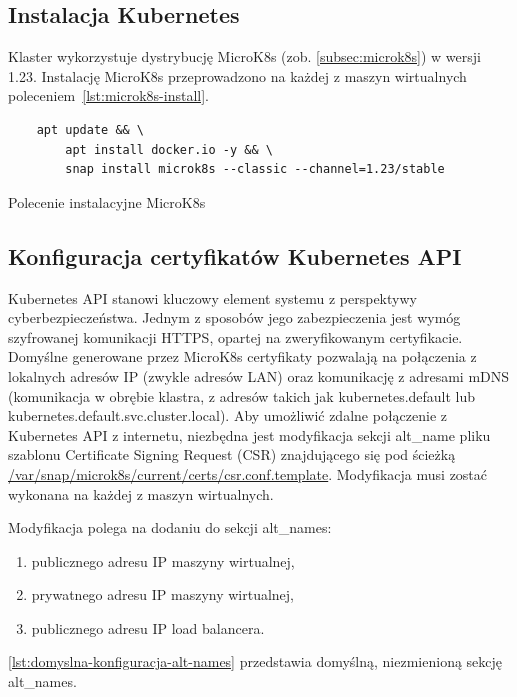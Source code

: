 \subsection{Instalacja Kubernetes}

Klaster wykorzystuje dystrybucję MicroK8s (zob. \autoref{subsec:microk8s}) w wersji 1.23.
Instalację MicroK8s przeprowadzono na każdej z maszyn wirtualnych poleceniem~\autoref{lst:microk8s-install}.

\begin{listing}[H]
    \begin{verbatim}
    apt update && \
        apt install docker.io -y && \
        snap install microk8s --classic --channel=1.23/stable
    \end{verbatim}
    \caption{Polecenie instalacyjne MicroK8s}
    \label{lst:microk8s-install}
\end{listing}

\subsection{Konfiguracja certyfikatów Kubernetes API}

Kubernetes API stanowi kluczowy element systemu z perspektywy cyberbezpieczeństwa.
Jednym z sposobów jego zabezpieczenia jest wymóg szyfrowanej komunikacji HTTPS, opartej na zweryfikowanym certyfikacie.
Domyślne generowane przez MicroK8s certyfikaty pozwalają na połączenia z lokalnych adresów IP (zwykle adresów LAN) oraz komunikację z adresami mDNS (komunikacja w obrębie klastra, z adresów takich jak kubernetes.default lub kubernetes.default.svc.cluster.local).
Aby umożliwić zdalne połączenie z Kubernetes API z internetu, niezbędna jest modyfikacja sekcji alt\_name pliku szablonu Certificate Signing Request (CSR) znajdującego się pod ścieżką \url{ /var/snap/microk8s/current/certs/csr.conf.template}.
Modyfikacja musi zostać wykonana na każdej z maszyn wirtualnych.

\noindent Modyfikacja polega na dodaniu do sekcji alt\_names:
\begin{enumerate}
    \item publicznego adresu IP maszyny wirtualnej,
    \item prywatnego adresu IP maszyny wirtualnej,
    \item publicznego adresu IP load balancera.
\end{enumerate}

\noindent\autoref{lst:domyslna-konfiguracja-alt-names} przedstawia domyślną, niezmienioną sekcję alt\_names.


